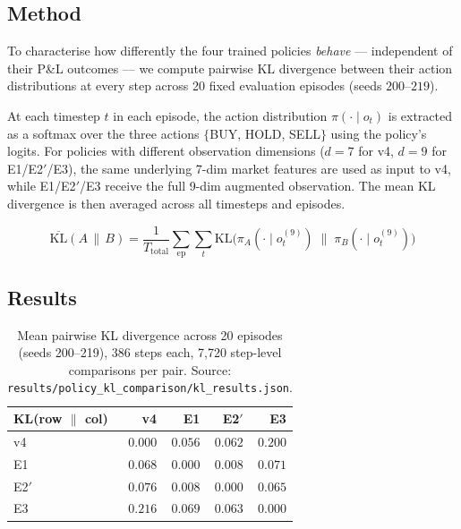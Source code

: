 \documentclass[11pt]{article}
\begin{document}
\subsection{Method}

To characterise how differently the four trained policies \emph{behave}
--- independent of their P\&L outcomes --- we compute pairwise KL
divergence between their action distributions at every step across 20
fixed evaluation episodes (seeds $200$--$219$).

At each timestep $t$ in each episode, the action distribution
$\pi(\cdot \mid o_t)$ is extracted as a softmax over the three actions
$\{$BUY, HOLD, SELL$\}$ using the policy's logits.
For policies with different observation dimensions ($d=7$ for v4,
$d=9$ for E1/E2$'$/E3), the same underlying 7-dim market features
are used as input to v4, while E1/E2$'$/E3 receive the full 9-dim
augmented observation.
The mean KL divergence is then averaged across all timesteps and episodes.

\[
  \overline{\mathrm{KL}}(A \,\|\, B)
  = \frac{1}{T_\mathrm{total}}
    \sum_{\text{ep}} \sum_{t}
    \mathrm{KL}\!\bigl(\pi_A(\cdot \mid o_t^{(9)}) \;\|\; \pi_B(\cdot \mid o_t^{(9)})\bigr)
\]

\subsection{Results}

\begin{table}[H]
\centering
\begin{tabular}{lrrrr}
\toprule
\textbf{KL(row $\|$ col)} & \textbf{v4} & \textbf{E1} & \textbf{E2$'$} & \textbf{E3} \\
\midrule
v4    & $0.000$ & $0.056$ & $0.062$ & $\mathbf{0.200}$ \\
E1    & $0.068$ & $0.000$ & $0.008$ & $0.071$ \\
E2$'$ & $0.076$ & $0.008$ & $0.000$ & $0.065$ \\
E3    & $\mathbf{0.216}$ & $0.069$ & $0.063$ & $0.000$ \\
\bottomrule
\end{tabular}
\caption{Mean pairwise KL divergence across 20 episodes (seeds 200--219),
         386 steps each, 7{,}720 step-level comparisons per pair.
         Source: \texttt{results/policy\_kl\_comparison/kl\_results.json}.}
\label{tab:kl_overall}
\end{table}
\end{document}
